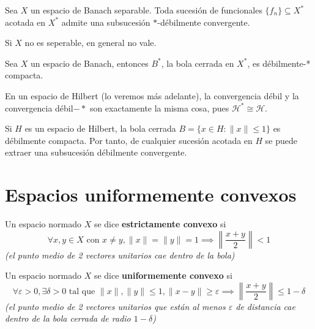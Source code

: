 \documentclass[12pt]{book}
\newcommand{\tbf}{\textbf}
\begin{document}
\begin{teo}
    Sea $X$ un espacio de Banach separable. Toda sucesión de funcionales $\{f_n\} \subseteq X^*$ acotada en $X^*$ admite una subsucesión $*$-débilmente convergente.
\end{teo}

\begin{observacion}
    Si $X$ no es seperable, en general no vale.
\end{observacion}


\begin{teo}
    Sea $X$ un espacio de Banach, entonces $B^*$, la bola cerrada en $X^*$, es débilmente-* compacta.
\end{teo}

\begin{observacion}
    En un espacio de Hilbert (lo veremos más adelante), la convergencia débil y la convergencia débil$-*$ son exactamente la misma cosa, pues $\mathcal{H}^* \cong \mathcal{H}$.
\end{observacion}


\begin{coro}
    Si $H$ es un espacio de Hilbert, la bola cerrada $B = \{x \in H : \|x\| \le 1\}$ es débilmente compacta. Por tanto, de cualquier sucesión acotada en $H$ se puede extraer una subsucesión débilmente convergente.
\end{coro}

\section{Espacios uniformemente convexos}

\begin{definicion}
    Un espacio normado $X$ se dice \textbf{estrictamente convexo} si
    \begin{equation*}
        \forall x, y \in X \text{ con } x \neq y, \|x\| = \|y\| = 1 \implies \left\| \frac{x+y}{2} \right\| < 1
    \end{equation*}
    \textit{\small (el punto medio de 2 vectores unitarios cae dentro de la bola)}
\end{definicion}

\begin{definicion}
    Un espacio normado $X$ se dice \tbf{uniformemente convexo} si 
    \begin{equation*}
        \forall \varepsilon > 0, \exists \delta > 0 \text{ tal que } \|x\|, \|y\| \leq 1, \|x - y\| \ge \varepsilon \implies \left\| \frac{x+y}{2} \right\| \leq 1 - \delta
    \end{equation*}
    \textit{\small (el punto medio de 2 vectores unitarios que están al menos $\varepsilon$ de distancia cae dentro de la bola cerrada de radio $1 - \delta$)}
\end{definicion}
\end{document}
